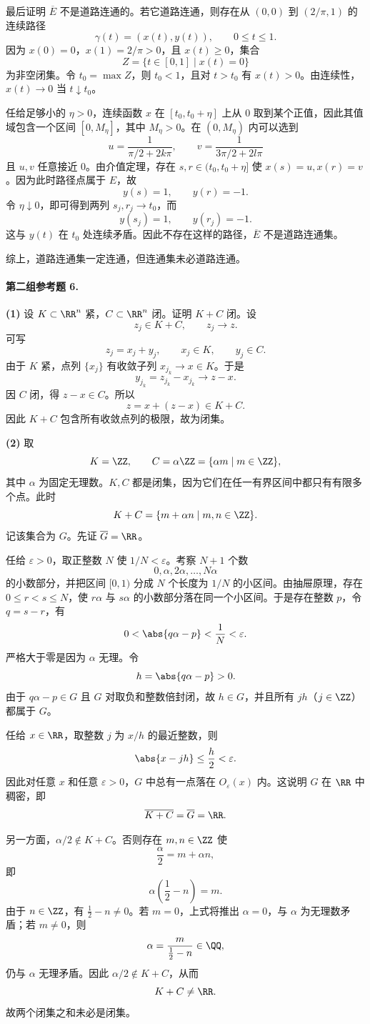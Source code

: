\begin{xsolution}
最后证明 $\overline E$ 不是道路连通的。若它道路连通，则存在从 $(0,0)$ 到 $(2/\pi,1)$ 的连续路径
\[
  \gamma(t)=(x(t),y(t)),\qquad 0\leq t\leq1.
\]
因为 $x(0)=0$，$x(1)=2/\pi>0$，且 $x(t)\geq0$，集合
\[
  Z=\{t\in[0,1]\mid x(t)=0\}
\]
为非空闭集。令 $t_0=\max Z$，则 $t_0<1$，且对 $t>t_0$ 有 $x(t)>0$。由连续性，$x(t)\to0$ 当 $t\downarrow t_0$。

任给足够小的 $\eta>0$，连续函数 $x$ 在 $[t_0,t_0+\eta]$ 上从 $0$ 取到某个正值，因此其值域包含一个区间 $[0,M_\eta]$，其中 $M_\eta>0$。在 $(0,M_\eta)$ 内可以选到
\[
  u=\frac1{\pi/2+2k\pi},
  \qquad
  v=\frac1{3\pi/2+2l\pi}
\]
且 $u,v$ 任意接近 $0$。由介值定理，存在 $s,r\in(t_0,t_0+\eta]$ 使 $x(s)=u,x(r)=v$。因为此时路径点属于 $E$，故
\[
  y(s)=1,
  \qquad
  y(r)=-1.
\]
令 $\eta\downarrow0$，即可得到两列 $s_j,r_j\to t_0$，而
\[
  y(s_j)=1,
  \qquad
  y(r_j)=-1.
\]
这与 $y(t)$ 在 $t_0$ 处连续矛盾。因此不存在这样的路径，$\overline E$ 不是道路连通集。

综上，道路连通集一定连通，但连通集未必道路连通。
\end{xsolution}

\paragraph{第二组参考题 6.}
\begin{xsolution}
\textbf{(1)} 设 $K\subset\RR^n$ 紧，$C\subset\RR^n$ 闭。证明 $K+C$ 闭。设
\[
  z_j\in K+C,
  \qquad
  z_j\to z.
\]
可写
\[
  z_j=x_j+y_j,
  \qquad x_j\in K,
  \qquad y_j\in C.
\]
由于 $K$ 紧，点列 $\{x_j\}$ 有收敛子列 $x_{j_k}\to x\in K$。于是
\[
  y_{j_k}=z_{j_k}-x_{j_k}\to z-x.
\]
因 $C$ 闭，得 $z-x\in C$。所以
\[
  z=x+(z-x)\in K+C.
\]
因此 $K+C$ 包含所有收敛点列的极限，故为闭集。

\textbf{(2)} 取
\[
  K=\ZZ,
  \qquad
  C=\alpha\ZZ=\{\alpha m\mid m\in\ZZ\},
\]
其中 $\alpha$ 为固定无理数。$K,C$ 都是闭集，因为它们在任一有界区间中都只有有限多个点。此时
\[
  K+C=\{m+\alpha n\mid m,n\in\ZZ\}.
\]
记该集合为 $G$。先证 $\overline G=\RR$。

任给 $\varepsilon>0$，取正整数 $N$ 使 $1/N<\varepsilon$。考察 $N+1$ 个数
\[
  0,\alpha,2\alpha,\ldots,N\alpha
\]
的小数部分，并把区间 $[0,1)$ 分成 $N$ 个长度为 $1/N$ 的小区间。由抽屉原理，存在 $0\leq r<s\leq N$，使 $r\alpha$ 与 $s\alpha$ 的小数部分落在同一个小区间。于是存在整数 $p$，令 $q=s-r$，有
\[
  0<\abs{q\alpha-p}<\frac1N<\varepsilon.
\]
严格大于零是因为 $\alpha$ 无理。令
\[
  h=\abs{q\alpha-p}>0.
\]
由于 $q\alpha-p\in G$ 且 $G$ 对取负和整数倍封闭，故 $h\in G$，并且所有 $jh$（$j\in\ZZ$）都属于 $G$。

任给 $x\in\RR$，取整数 $j$ 为 $x/h$ 的最近整数，则
\[
  \abs{x-jh}\leq\frac h2<\varepsilon.
\]
因此对任意 $x$ 和任意 $\varepsilon>0$，$G$ 中总有一点落在 $O_\varepsilon(x)$ 内。这说明 $G$ 在 $\RR$ 中稠密，即
\[
  \overline{K+C}=\overline G=\RR.
\]

另一方面，$\alpha/2\notin K+C$。否则存在 $m,n\in\ZZ$ 使
\[
  \frac\alpha2=m+\alpha n,
\]
即
\[
  \alpha\left(\frac12-n\right)=m.
\]
由于 $n\in\ZZ$，有 $\frac12-n\neq0$。若 $m=0$，上式将推出 $\alpha=0$，与 $\alpha$ 为无理数矛盾；若 $m\neq0$，则
\[
  \alpha=\frac{m}{\frac12-n}\in\QQ,
\]
仍与 $\alpha$ 无理矛盾。因此 $\alpha/2\notin K+C$，从而
\[
  K+C\neq\RR.
\]
故两个闭集之和未必是闭集。
\end{xsolution}
